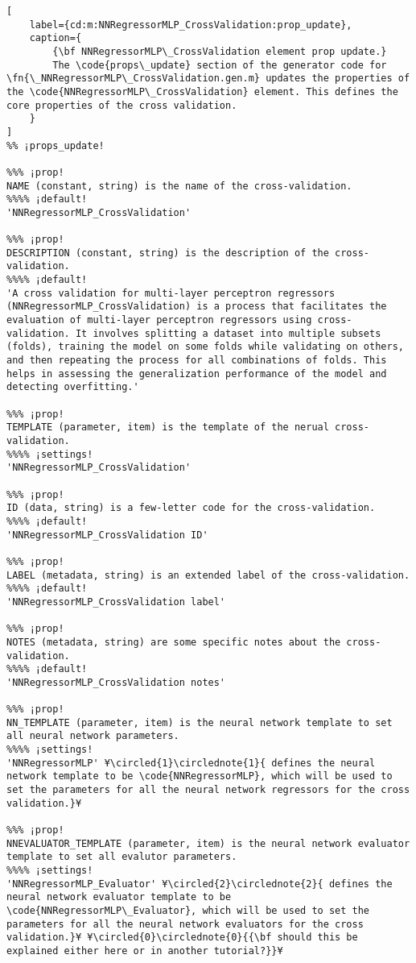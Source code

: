 \documentclass{tufte-handout}
\begin{document}
\begin{lstlisting}[
	label={cd:m:NNRegressorMLP_CrossValidation:prop_update},
	caption={
		{\bf NNRegressorMLP\_CrossValidation element prop update.}
		The \code{props\_update} section of the generator code for \fn{\_NNRegressorMLP\_CrossValidation.gen.m} updates the properties of the \code{NNRegressorMLP\_CrossValidation} element. This defines the core properties of the cross validation.
	}
]
%% ¡props_update!

%%% ¡prop!
NAME (constant, string) is the name of the cross-validation.
%%%% ¡default!
'NNRegressorMLP_CrossValidation'

%%% ¡prop!
DESCRIPTION (constant, string) is the description of the cross-validation.
%%%% ¡default!
'A cross validation for multi-layer perceptron regressors (NNRegressorMLP_CrossValidation) is a process that facilitates the evaluation of multi-layer perceptron regressors using cross-validation. It involves splitting a dataset into multiple subsets (folds), training the model on some folds while validating on others, and then repeating the process for all combinations of folds. This helps in assessing the generalization performance of the model and detecting overfitting.'

%%% ¡prop!
TEMPLATE (parameter, item) is the template of the nerual cross-validation.
%%%% ¡settings!
'NNRegressorMLP_CrossValidation'

%%% ¡prop!
ID (data, string) is a few-letter code for the cross-validation.
%%%% ¡default!
'NNRegressorMLP_CrossValidation ID'

%%% ¡prop!
LABEL (metadata, string) is an extended label of the cross-validation.
%%%% ¡default!
'NNRegressorMLP_CrossValidation label'

%%% ¡prop!
NOTES (metadata, string) are some specific notes about the cross-validation.
%%%% ¡default!
'NNRegressorMLP_CrossValidation notes'

%%% ¡prop!
NN_TEMPLATE (parameter, item) is the neural network template to set all neural network parameters.
%%%% ¡settings!
'NNRegressorMLP' ¥\circled{1}\circlednote{1}{ defines the neural network template to be \code{NNRegressorMLP}, which will be used to set the parameters for all the neural network regressors for the cross validation.}¥

%%% ¡prop!
NNEVALUATOR_TEMPLATE (parameter, item) is the neural network evaluator template to set all evalutor parameters.
%%%% ¡settings!
'NNRegressorMLP_Evaluator' ¥\circled{2}\circlednote{2}{ defines the neural network evaluator template to be \code{NNRegressorMLP\_Evaluator}, which will be used to set the parameters for all the neural network evaluators for the cross validation.}¥ ¥\circled{0}\circlednote{0}{{\bf should this be explained either here or in another tutorial?}}¥


\end{lstlisting}
\end{document}
